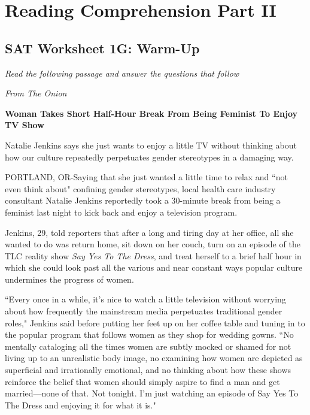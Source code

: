\chapter{Reading Comprehension Part II}
\section{SAT Worksheet 1G: Warm-Up}
\textit{Read the following passage and answer the questions that follow}

\bigskip
\textit{From The Onion}
\begin{center}
\textbf{Woman Takes Short Half-Hour Break From Being Feminist To Enjoy TV Show}
\end{center}

\begin{linenumbers*}
\modulolinenumbers[5]
\indent Natalie Jenkins says she just wants to enjoy a little TV without thinking about how our culture repeatedly perpetuates gender stereotypes in a damaging way.

\bigskip
\indent PORTLAND, OR-Saying that she just wanted a little time to relax and ``not even think about" confining gender stereotypes, local health care industry consultant Natalie Jenkins reportedly took a 30-minute break from being a feminist last night to kick back and enjoy a television program.

\indent Jenkins, 29, told reporters that after a long and tiring day at her office, all she wanted to do was return home, sit down on her couch, turn on an episode of the TLC reality show \textit{Say Yes To The Dress}, and treat herself to a brief half hour in which she could look past all the various and near constant ways popular culture undermines the progress of women.

\indent
``Every once in a while, it's nice to watch a little television without worrying about how frequently the mainstream media perpetuates traditional gender roles," Jenkins said before putting her feet up on her coffee table and tuning in to the popular program that follows women as they shop for wedding gowns. ``No mentally cataloging all the times women are subtly mocked or shamed for not living up to an unrealistic body image, no examining how women are depicted as superficial and irrationally emotional, and no thinking about how these shows reinforce the belief that women should simply aspire to find a man and get married—none of that. Not tonight. I'm just watching an episode of Say Yes To The Dress and enjoying it for what it is."


\end{linenumbers*}
